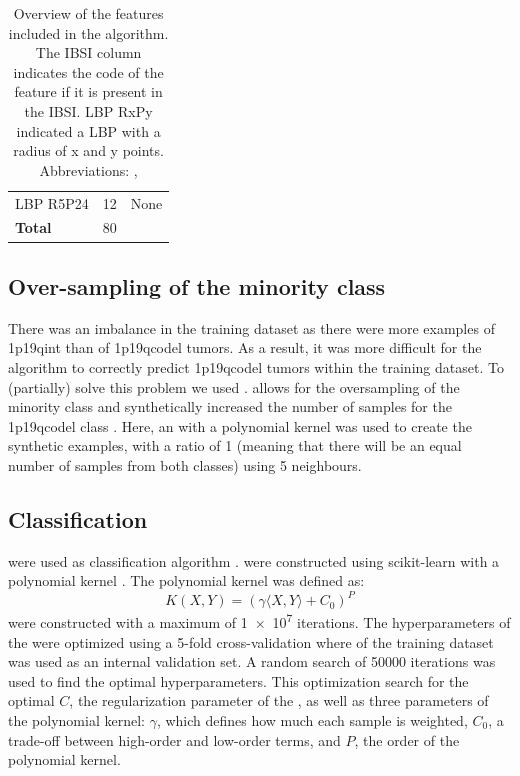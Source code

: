 \begin{subappendices}
\begin{table}[htbp]
\begin{tabular}{L{3.9cm}R{0.3cm}L{5.7cm}}
        \hspace{1em}\acrshort{LBP} R5P24 & 12 & None \\
        \addlinespace
        \textbf{Total} & 80 & \\
        \bottomrule
    \end{tabular}
    \caption{Overview of the features included in the algorithm. The \acrshort{IBSI} column indicates the code of the feature if it is present in the \acrshort{IBSI}. \acrshort{LBP} RxPy indicated a \acrshort{LBP} with a radius of x and y points. Abbreviations: , }\label{tab:LGG_1p19q_ISBI}
\end{table}

\subsection{Over-sampling of the minority class}
There was an imbalance in the training dataset as there were more examples of \acl{1p19qint} than of \acl{1p19qcodel} \glspl{tumor}.
As a result, it was more difficult for the algorithm to correctly predict \acl{1p19qcodel} \glspl{tumor} within the training dataset.
To (partially) solve this problem we used .
 allows for the oversampling of the minority class and synthetically increased the number of samples for the \acl{1p19qcodel} class \autocite{chawla2002smote}.
Here, an  with a polynomial kernel was used to create the synthetic examples, with a ratio of 1 (meaning that there will be an equal number of samples from both classes) using 5 neighbours.

\subsection{Classification}
 were used as classification algorithm \autocite{cortes1995support}.
 were constructed using scikit-learn with a polynomial kernel \autocite{pedregosa2011scikit}.
The polynomial kernel was defined as:
\begin{equation*}
    K(X, Y) = {\left(\gamma \langle X, Y \rangle + C_0\right)}^P
\end{equation*}
 were constructed with a maximum of \num{1e7} iterations.
The hyperparameters of the  were optimized using a 5-fold cross-validation where  of the training dataset was used as an internal validation set.
A random search of \num{50000} iterations was used to find the optimal hyperparameters.
This optimization search for the optimal $C$, the regularization parameter of the , as well as three parameters of the polynomial kernel: $\gamma$, which defines how much each sample is weighted, $C_0$, a trade-off between high-order and low-order terms, and $P$, the order of the polynomial kernel.


\end{subappendices}
